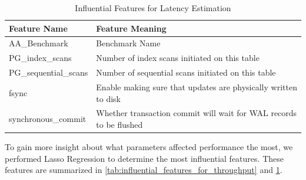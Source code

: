 \begin{table}
  \centering
  \small{
    \centering
    \begin{tabular}{ll}
      \toprule
      Feature Name        & Feature Meaning                                                    \\
      \midrule
      AA\_Benchmark        & Benchmark Name                                                     \\
      PG\_index\_scans      & Number of index scans initiated on this table                      \\
      PG\_sequential\_scans & Number of sequential scans initiated on this table                 \\
      fsync               & Enable making sure that updates are physically written to disk     \\
      synchronous\_commit  & Whether transaction commit will wait for WAL records to be flushed \\
      \bottomrule
    \end{tabular}
  }
  \caption{Influential Features for Latency Estimation}
  \label{tab:influential_features_for_latency}
\end{table}

To gain more insight about what parameters affected performance the
most, we performed Lasso Regression to determine the most influential
features. These features are summarized in
\cref{tab:influential_features_for_throughput} and
\cref{tab:influential_features_for_latency}.
